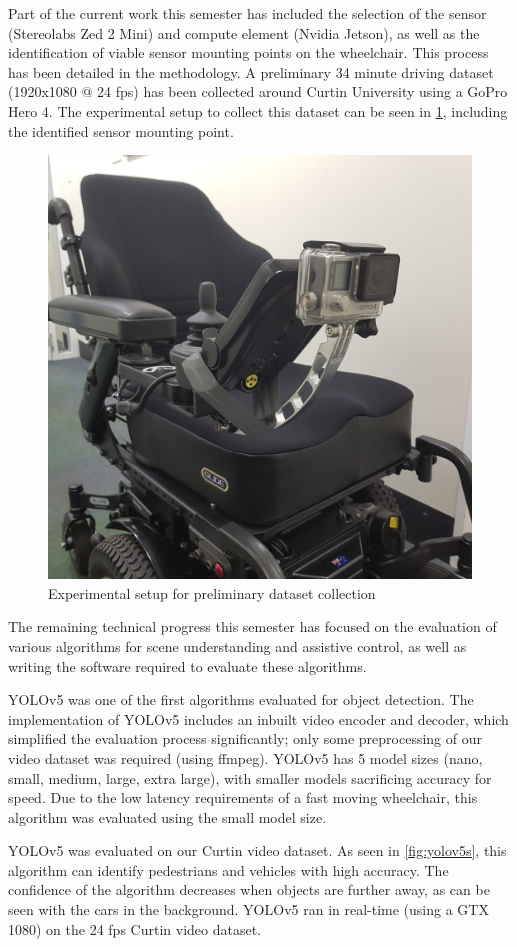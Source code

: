 Part of the current work this semester has included the selection of the sensor (Stereolabs Zed 2 Mini) and compute element (Nvidia Jetson),
as well as the identification of viable sensor mounting points on the wheelchair. This process has been detailed in the methodology.
A preliminary 34 minute driving dataset (1920x1080 @ 24 fps) has been collected around Curtin University using a GoPro Hero 4.
The experimental setup to collect this dataset can be seen in \cref{fig:gopro_dataset_collection}, including the identified
sensor mounting point.

\begin{figure}[bp]
    \centering
    \includegraphics[width=0.45\linewidth,angle=270,origin=c]{images/gopro_dataset_collection.jpg}
    \caption{Experimental setup for preliminary dataset collection}
    \label{fig:gopro_dataset_collection}
\end{figure}

The remaining technical progress this semester has focused on the evaluation of various algorithms for scene understanding
and assistive control, as well as writing the software required to evaluate these algorithms.

YOLOv5 \cite{ultralyticsYOLOv5} was one of the first algorithms evaluated for object detection.
The implementation of YOLOv5 includes an inbuilt video encoder and decoder, which simplified
the evaluation process significantly; only some preprocessing of our video dataset was required (using ffmpeg).
YOLOv5 has 5 model sizes (nano, small, medium, large, extra large),
with smaller models sacrificing accuracy for speed.
Due to the low latency requirements of a fast moving wheelchair, this algorithm was evaluated using the small model size.

YOLOv5 was evaluated on our Curtin video dataset. As seen in \cref{fig:yolov5s}, this algorithm can identify pedestrians and vehicles with high accuracy.
The confidence of the algorithm decreases when objects are further away, as can be seen with the cars in the background.
YOLOv5 ran in real-time (using a GTX 1080) on the 24 fps Curtin video dataset.


